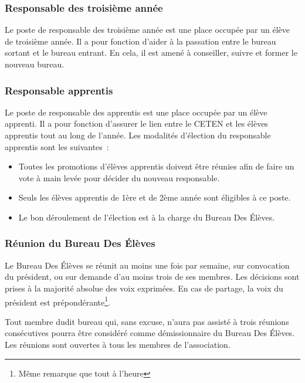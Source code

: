 \documentclass{article} %
\begin{document}
			\subsubsection{Responsable des troisième année}

				Le poste de responsable des troisième année est une place
				occupée par un élève de troisième année. Il a pour fonction
				d’aider à la passation entre le bureau sortant et le bureau
				entrant. En cela, il est amené à conseiller, suivre et former le
				nouveau bureau.

			\subsubsection{Responsable apprentis}

				Le poste de responsable des apprentis est une place occupée par
				un élève apprenti. Il a pour fonction d’assurer le lien entre le
				CETEN et les élèves apprentis tout au long de l’année. Les
				modalités d’élection du responsable apprentis sont les
				suivantes :
				\begin{itemize}
					\item Toutes les promotions d’élèves apprentis doivent être
						réunies afin de faire un vote à main levée pour décider
						du nouveau responsable.
					\item Seuls les élèves apprentis de 1ère et de 2ème année
						sont éligibles à ce poste.
					\item Le bon déroulement de l’élection est à la charge du
						Bureau Des Élèves.
				\end{itemize}

			\subsubsection{Réunion du Bureau Des Élèves}

				Le Bureau Des Élèves se réunit au moins une fois par semaine,
				sur convocation du président, ou sur demande d'au moins trois de
				ses membres. Les décisions sont prises à la majorité absolue des
				voix exprimées. En cas de partage, la voix du président est
				prépondérante\footnote{Même remarque que tout à l'heure}. 

				Tout membre dudit bureau qui, sans excuse, n’aura pas assisté à
				trois réunions consécutives pourra être considéré comme
				démissionnaire du Bureau Des Élèves. Les réunions sont ouvertes
				à tous les membres de l’association.
\end{document}
